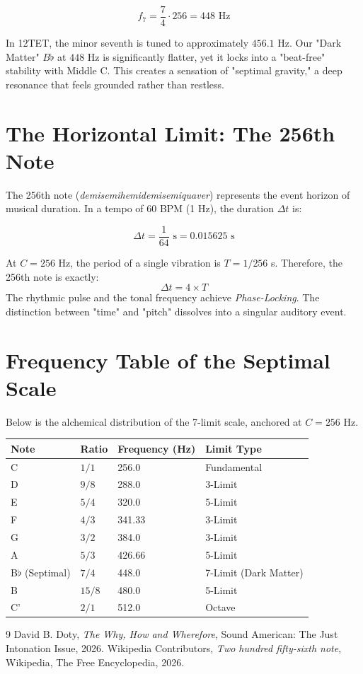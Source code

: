 \documentclass[11pt]{article}
\begin{document}
\begin{equation}
f_{7} = \frac{7}{4} \cdot 256 = 448 \text{ Hz}
\end{equation}

In 12TET, the minor seventh is tuned to approximately $456.1$ Hz. Our "Dark Matter" $B\flat$ at $448$ Hz is significantly flatter, yet it locks into a "beat-free" stability with Middle C. This creates a sensation of "septimal gravity," a deep resonance that feels grounded rather than restless.

\section{The Horizontal Limit: The 256th Note}
The 256th note (\textit{demisemihemidemisemiquaver}) represents the event horizon of musical duration. In a tempo of 60 BPM (1 Hz), the duration $\Delta t$ is:

\begin{equation}
\Delta t = \frac{1}{64} \text{ s} = 0.015625 \text{ s}
\end{equation}

At $C=256$ Hz, the period of a single vibration is $T = 1/256$ s. Therefore, the 256th note is exactly:
\begin{equation}
\Delta t = 4 \times T
\end{equation}
The rhythmic pulse and the tonal frequency achieve \textit{Phase-Locking}. The distinction between "time" and "pitch" dissolves into a singular auditory event.

\appendix
\section{Frequency Table of the Septimal Scale}
Below is the alchemical distribution of the 7-limit scale, anchored at $C=256$ Hz.

\begin{table}[h!]
\centering
\renewcommand{\arraystretch}{1.5}
\begin{tabular}{@{}llll@{}}
\toprule
Note & Ratio & Frequency (Hz) & Limit Type \\ \midrule
C & $1/1$ & 256.0 & Fundamental \\
D & $9/8$ & 288.0 & 3-Limit \\
E & $5/4$ & 320.0 & 5-Limit \\
F & $4/3$ & 341.33 & 3-Limit \\
G & $3/2$ & 384.0 & 3-Limit \\
A & $5/3$ & 426.66 & 5-Limit \\
B$\flat$ (Septimal) & $7/4$ & 448.0 & 7-Limit (Dark Matter) \\
B & $15/8$ & 480.0 & 5-Limit \\
C' & $2/1$ & 512.0 & Octave \\ \bottomrule
\end{tabular}
\end{table}

\begin{thebibliography}{9}
David B. Doty, \textit{The Why, How and Wherefore}, Sound American: The Just Intonation Issue, 2026.
Wikipedia Contributors, \textit{Two hundred fifty-sixth note}, Wikipedia, The Free Encyclopedia, 2026.
\end{thebibliography}
\end{document}
